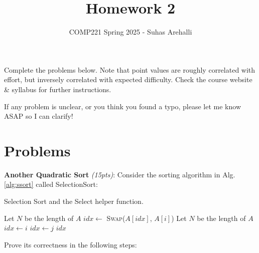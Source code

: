 \documentclass{exam}
\title{Homework 2}
\author{COMP221 Spring 2025 - Suhas Arehalli}
\date{}
\begin{document}
\maketitle

Complete the problems below. Note that point values are roughly correlated with effort, but inversely correlated with expected difficulty. Check the course website \& syllabus for further instructions.

If any problem is unclear, or you think you found a typo, please let me know ASAP so I can clarify!

\section*{Problems}

\begin{questions}
    \question \textbf{Another Quadratic Sort} \textit{(15pts)}: Consider the sorting algorithm in Alg. \ref{alg:ssort} called SelectionSort:

    \begin{algorithm}
        \caption{Selection Sort and the Select helper function.}
        \label{alg:ssort}
        \begin{algorithmic}
            \State Let $N$ be the length of $A$
                \State $idx \gets $
                \State \textsc{Swap}($A[idx]$, $A[i]$)
            \EndFor
        \EndFunction
            \State Let $N$ be the length of $A$
            \State $idx \gets i$
                    \State $idx \gets j$
                \EndIf
            \EndFor
            \State \Return $idx$
        \EndFunction
        \end{algorithmic}
    \end{algorithm}

    Prove its correctness in the following steps:
\end{questions}
\end{document}
